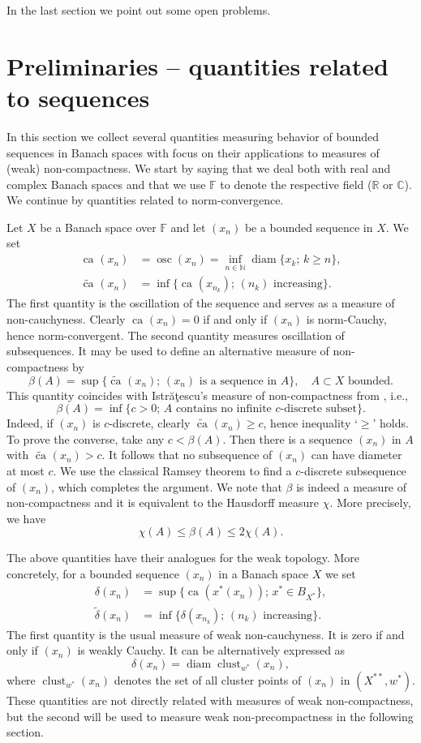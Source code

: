 \documentclass{amsart}
\numberwithin{equation}{section}
\theoremstyle{definition}
\def\ce{\mathbb C}
\def\diam{\operatorname{diam}}
\def\en{\mathbb N}
\def\er{\mathbb R}
\def\ef{\mathbb F}
\def\osc{\operatorname{osc}}
\def\clu#1{\operatorname{clust}_{w^*}(#1)}
\def\wde#1{\widetilde{\delta}\left(#1\right)}
\def\de#1{\delta\left(#1\right)}
\newcommand{\ca}[2][]{\operatorname{ca}_{#1}\left(#2\right)}
\newcommand{\wca}[2][]{\widetilde{\operatorname{ca}}_{#1}\left(#2\right)}
\newcommand{\setsep}{;\,}
\begin{document}
In the last section we point out some open problems. 

\section{Preliminaries -- quantities related to sequences}\label{sec:prel}

In this section we collect several quantities measuring behavior of bounded sequences in Banach spaces 
with focus on their applications to measures of (weak) non-compactness. 
We start by saying that we deal both with real and complex Banach spaces and that we use $\ef$ to denote the respective field ($\er$ or $\ce$). We continue by quantities related to norm-convergence. 


Let $X$ be a Banach space over $\ef$ and let $(x_n)$ be a bounded sequence in $X$.
We set
$$\begin{aligned}
\ca{x_n} & = \osc(x_n) = \inf_{n\in\en} \diam\{x_k\setsep k\ge n\},\\
\wca{x_n} & = \inf\{ \ca{x_{n_k}}\setsep (n_k)\mbox{ increasing}\}.
\end{aligned}$$
The first quantity is the oscillation of the sequence and serves as a measure of non-cauchyness. Clearly $\ca{x_n}=0$ if and only if $(x_n)$ is  norm-Cauchy, hence norm-convergent. The second quantity measures oscillation of subsequences. It may be used to define an alternative measure of non-compactness by
$$\beta(A)=\sup\{\wca{x_n}\setsep (x_n)\mbox{ is a sequence in }A\}, \quad A\subset X\mbox{ bounded}.$$
This quantity coincides with Istr\u{a}\c{t}escu's measure of non-compactness from \cite{istratescu}, i.e.,
$$\beta(A)=\inf\{c>0\setsep A \mbox{ contains no infinite $c$-discrete subset}\}.$$
Indeed, if $(x_n)$ is $c$-discrete, clearly $\wca{x_n}\ge c$, hence inequality `$\ge$' holds. To prove the converse, take any $c<\beta(A)$. Then there is a sequence $(x_n)$ in $A$ with $\wca{x_n}>c$. It follows that no subsequence of $(x_n)$ can have diameter at most $c$. We use the classical Ramsey theorem to find a
$c$-discrete subsequence of $(x_n)$, which completes the argument. We note that $\beta$ is indeed a measure of non-compactness and it is equivalent to the Hausdorff measure $\chi$. More precisely, we have
$$\chi(A)\le \beta(A)\le 2\chi(A).$$
 
The above quantities have their analogues for the weak topology. More concretely, for a bounded sequence $(x_n)$
in a Banach space $X$ we set
$$\begin{aligned}
\de{x_n} & = \sup \{\ca{x^*(x_n)}\setsep x^*\in B_{X^*}\},\\
\wde{x_n} & = \inf\{ \de{x_{n_k}}\setsep (n_k)\mbox{ increasing}\}.
\end{aligned}$$
The first quantity is the usual measure of weak non-cauchyness. It is zero if and only if $(x_n)$ is weakly Cauchy. 
It can be alternatively expressed as
$$\de{x_n}=\diam \clu{x_n},$$
where $\clu{x_n}$ denotes the set of all cluster points of $(x_n)$ in $(X^{**},w^*)$. These quantities are not directly related with measures of weak non-compactness, but the second will be used to measure weak non-precompactness in the following section. 
\end{document}
